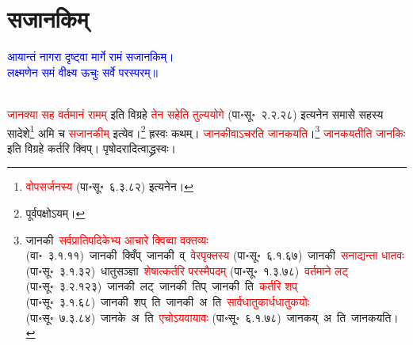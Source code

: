 \section[सजानकिम्]{सजानकिम्‌}
\centering\textcolor{blue}{आयान्तं नागरा दृष्ट्वा मार्गे रामं सजानकिम्।\nopagebreak\\
लक्ष्मणेन समं वीक्ष्य ऊचुः सर्वे परस्परम्॥}\nopagebreak\\
\\
\begin{sloppypar}\justifying\noindent\hspace{10mm} \textcolor{red}{जानक्या सह वर्तमानं रामम्‌} इति विग्रहे \textcolor{red}{तेन सहेति तुल्य\-योगे} (पा॰सू॰~२.२.२८) इत्यनेन समासे सहस्य सादेशे\footnote{\textcolor{red}{वोपसर्जनस्य} (पा॰सू॰~६.३.८२) इत्यनेन।} अमि च \textcolor{red}{सजानकीम्‌} इत्येव।\footnote{पूर्वपक्षोऽयम्।} ह्रस्वः कथम्।
\textcolor{red}{जानकीवाऽचरति जानकयति}।\footnote{जानकी~\arrow \textcolor{red}{सर्वप्राति\-पदिकेभ्य आचारे क्विब्वा वक्तव्यः} (वा॰~३.१.११)~\arrow जानकी~क्विँप्~\arrow जानकी~व्~\arrow \textcolor{red}{वेरपृक्तस्य} (पा॰सू॰~६.१.६७)~\arrow जानकी~\arrow \textcolor{red}{सनाद्यन्ता धातवः} (पा॰सू॰~३.१.३२)~\arrow धातु\-सञ्ज्ञा~\arrow \textcolor{red}{शेषात्कर्तरि परस्मैपदम्} (पा॰सू॰~१.३.७८)~\arrow \textcolor{red}{वर्तमाने लट्} (पा॰सू॰~३.२.१२३)~\arrow जानकी~लट्~\arrow जानकी~तिप्~\arrow जानकी~ति~\arrow \textcolor{red}{कर्तरि शप्} (पा॰सू॰~३.१.६८)~\arrow जानकी~शप्~ति~\arrow जानकी~अ~ति~\arrow \textcolor{red}{सार्वधातुकार्ध\-धातुकयोः} (पा॰सू॰~७.३.८४)~\arrow जानके~अ~ति~\arrow \textcolor{red}{एचोऽयवायावः} (पा॰सू॰~६.१.७८)~\arrow जानकय्~अ~ति~\arrow जानकयति।} \textcolor{red}{जानकयतीति जानकिः} इति विग्रहे कर्तरि क्विप्।
पृषोदरादित्वाद्ध्रस्वः।

\end{sloppypar}
